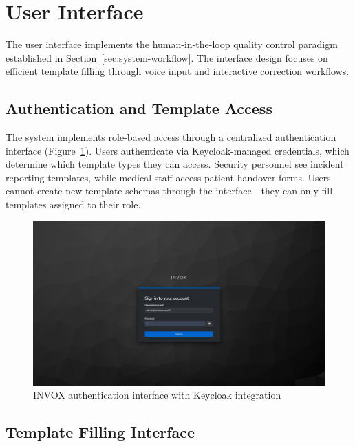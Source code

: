\section{User Interface}
\label{sec:user-interface}

The user interface implements the human-in-the-loop quality control paradigm established in Section~\ref{sec:system-workflow}. The interface design focuses on efficient template filling through voice input and interactive correction workflows.

\subsection{Authentication and Template Access}
\label{subsec:ui-authentication}

The system implements role-based access through a centralized authentication interface (Figure~\ref{fig:login-interface}). Users authenticate via Keycloak-managed credentials, which determine which template types they can access. Security personnel see incident reporting templates, while medical staff access patient handover forms. Users cannot create new template schemas through the interface—they can only fill templates assigned to their role.

\begin{figure}[H]
  \centering
  \includegraphics[width=1.0\linewidth]{images/login_interface.png}
  \caption{INVOX authentication interface with Keycloak integration}
  \label{fig:login-interface}
\end{figure}

\subsection{Template Filling Interface}
\label{subsec:ui-template-filling}


